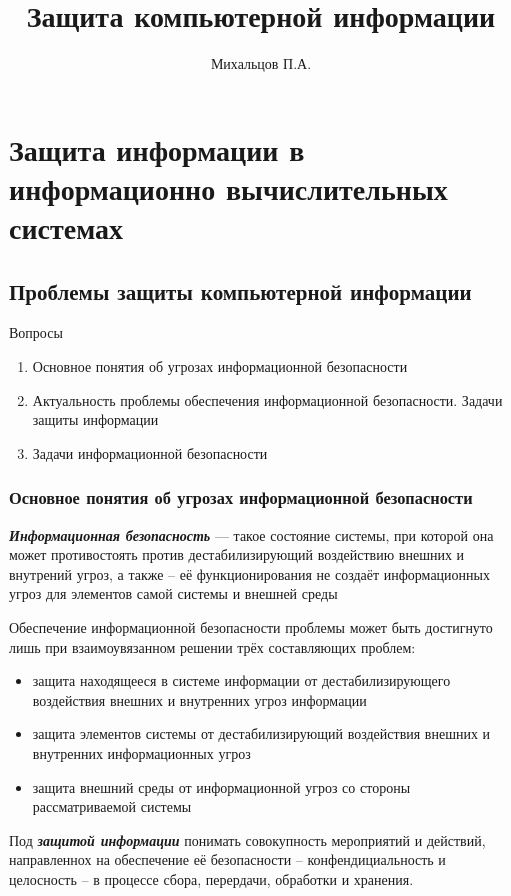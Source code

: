 \documentclass[a4paper,12pt]{extarticle}
\title{\textbf{Защита компьютерной информации}}
\author{Михальцов П.А.}
\begin{document}
	\maketitle
	\section{Защита информации в информационно вычислительных системах}
	\subsection{Проблемы защиты компьютерной информации}
	Вопросы 
	\begin{enumerate}
		\item Основное понятия об угрозах информационной безопасности
		\item Актуальность проблемы обеспечения информационной безопасности. Задачи защиты информации
		\item Задачи информационной безопасности
	\end{enumerate}
	\subsubsection{Основное понятия об угрозах информационной безопасности}
	\textbf{\textit{Информационная безопасность}} --- такое состояние системы, при которой она может противостоять против дестабилизирующий воздействию внешних и внутрений угроз, а также -- её функционирования не создаёт информационных угроз для элементов самой системы и внешней среды
	
	Обеспечение информационной безопасности проблемы может быть достигнуто лишь при взаимоувязанном решении трёх составляющих проблем:
	\begin{itemize}
		\item защита находящееся в системе информации от дестабилизирующего воздействия внешних и внутренних угроз информации
		\item защита элементов системы от дестабилизирующий воздействия внешних и внутренних информационных угроз 
		\item защита внешний среды от информационной угроз со стороны рассматриваемой системы 
	\end{itemize}

	\vspace{\baselineskip}
	Под \textbf{\textit{защитой информации}} понимать совокупность мероприятий и действий, направленнох на обеспечение её безопасности -- конфендициальность и целосность -- в процессе сбора, перердачи, обработки и хранения.
	
\end{document}
